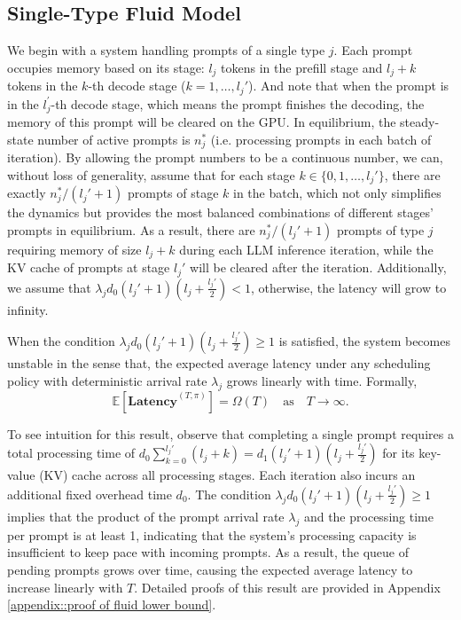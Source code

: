 \subsection{Single-Type Fluid Model}
We begin with a system handling prompts of a single type \(j\). Each prompt occupies memory based on its stage: \(l_j\) tokens in the prefill stage and \(l_j + k\) tokens in the \(k\)-th decode stage (\(k = 1, \dots, l_j'\)). And note that when the prompt is in the $l_j^\prime$-th decode stage, which means the prompt finishes the decoding, the memory of this prompt will be cleared on the GPU. In equilibrium, the steady-state number of active prompts is \(n_j^*\) (i.e. processing prompts in each batch of iteration). By allowing the prompt numbers to be a continuous number, we can, without loss of generality, assume that for each stage $k\in\{0,1,\dots,l_j'\}$, 
there are exactly $n_j^*/(l_j'+1)$ prompts of stage $k$ in the batch, which not only simplifies the dynamics but provides the most balanced combinations of different stages' prompts in equilibrium. As a result, there are $n_j^*/(l_j'+1)$ prompts of type $j$ requiring memory of size $l_j+k$ during each LLM inference iteration, while the KV cache of prompts at stage $l_j'$ will be cleared after the iteration.  Additionally, we assume that $\lambda_j d_0 (l_j' + 1) \left( l_j + \frac{l_j'}{2} \right) <1$, otherwise, the latency will grow to infinity.
\begin{proposition}\label{prop:large_rate}
When the condition  $
\lambda_j d_0 (l_j' + 1) \left( l_j + \frac{l_j'}{2} \right) \geq 1
$
is satisfied, the system becomes unstable in the sense that, the expected average latency under any scheduling policy with deterministic arrival rate \( \lambda_j \) grows linearly with time. Formally,  
\[
\mathbb{E}[\textbf{Latency}^{(T,\pi)}] = \Omega(T) \quad \text{as} \quad T \to \infty.
\]
\end{proposition}
To see intuition for this result, observe that completing a single prompt requires a total processing time of \(d_0 \sum_{k=0}^{l_j'} (l_j + k) = d_1 (l_j' + 1) \left( l_j + \frac{l_j'}{2} \right)\) for its key-value (KV) cache across all processing stages. Each iteration also incurs an additional fixed overhead time \(d_0\). The condition \(\lambda_j d_0 (l_j' + 1) \left( l_j + \frac{l_j'}{2} \right) \geq 1\) implies that the product of the prompt arrival rate \(\lambda_j\) and the processing time per prompt is at least 1, indicating that the system’s processing capacity is insufficient to keep pace with incoming prompts. As a result, the queue of pending prompts grows over time, causing the expected average latency to increase linearly with \(T\). Detailed proofs of this result are provided in Appendix \ref{appendix::proof of fluid lower bound}.

